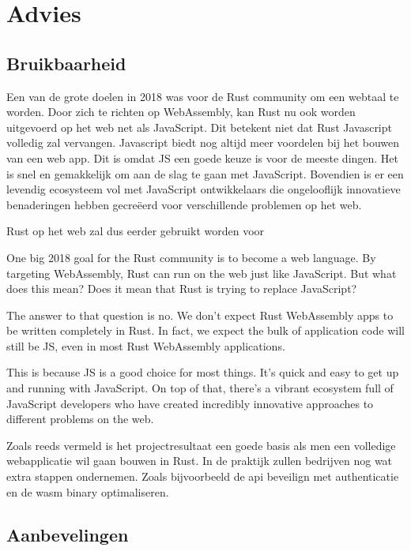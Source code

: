 \chapter{Advies}

\section{Bruikbaarheid}

Een van de grote doelen in 2018 was voor de Rust community om een webtaal te worden. Door zich te
richten op WebAssembly, kan Rust nu ook worden uitgevoerd op het web net als JavaScript. Dit
betekent niet dat Rust Javascript volledig zal vervangen. Javascript biedt nog altijd meer voordelen
bij het bouwen van een web app. Dit is omdat JS een goede keuze is voor de meeste dingen. Het is
snel en gemakkelijk om aan de slag te gaan met JavaScript. Bovendien is er een levendig ecosysteem
vol met JavaScript ontwikkelaars die ongelooflijk innovatieve benaderingen hebben gecreëerd voor
verschillende problemen op het web.

Rust op het web zal dus eerder gebruikt worden voor


One big 2018 goal for the Rust community is to become a web language. By targeting WebAssembly, Rust
can run on the web just like JavaScript. But what does this mean? Does it mean that Rust is trying
to replace JavaScript?

The answer to that question is no. We don’t expect Rust WebAssembly apps to be written completely in
Rust. In fact, we expect the bulk of application code will still be JS, even in most Rust
WebAssembly applications.

This is because JS is a good choice for most things. It’s quick and easy to get up and running with
JavaScript. On top of that, there’s a vibrant ecosystem full of JavaScript developers who have
created incredibly innovative approaches to different problems on the web.


Zoals reeds vermeld is het projectresultaat een goede basis als men een volledige webapplicatie wil
gaan bouwen in Rust. In de praktijk zullen bedrijven nog wat extra stappen ondernemen. Zoals
bijvoorbeeld de api beveilign met authenticatie en de wasm binary optimaliseren.



\section{Aanbevelingen}



